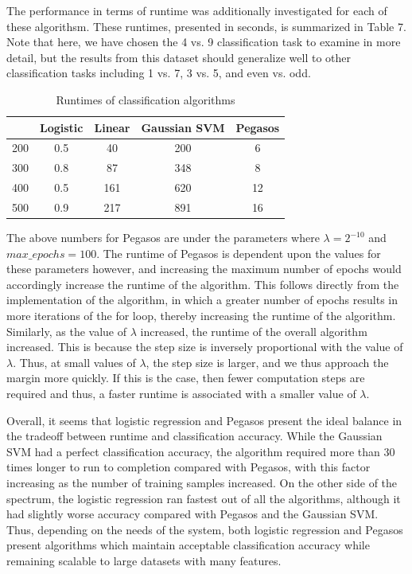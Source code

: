 \documentclass{article}
\begin{document}
The performance in terms of runtime was additionally investigated for each of these algorithsm. These runtimes, presented in seconds, is summarized in Table 7. Note that here, we have chosen the 4 vs. 9 classification task to examine in more detail, but the results from this dataset should generalize well to other classification tasks including 1 vs. 7, 3 vs. 5, and even vs. odd.

\begin{table}
  \begin{center}
    \begin{tabular}{ | c | c | c | c | c | }
      \hline
             & Logistic     & Linear   & Gaussian SVM & Pegasos    \\ \hline
      200    & 0.5          & 40           & 200           & 6          \\ \hline
      300    & 0.8          & 87           & 348           & 8          \\ \hline
      400    & 0.5          & 161          & 620           & 12         \\ \hline
      500    & 0.9          & 217          & 891           & 16         \\ \hline
    \end{tabular}
  \end{center}
  \caption{Runtimes of classification algorithms}
\end{table}

The above numbers for Pegasos are under the parameters where $\lambda = 2^{-10}$ and $max\_epochs = 100$. The runtime of Pegasos is dependent upon the values for these parameters however, and increasing the maximum number of epochs would accordingly increase the runtime of the algorithm. This follows directly from the implementation of the algorithm, in which a greater number of epochs results in more iterations of the for loop, thereby increasing the runtime of the algorithm. Similarly, as the value of $\lambda$ increased, the runtime of the overall algorithm increased. This is because the step size is inversely proportional with the value of $\lambda$. Thus, at small values of $\lambda$, the step size is larger, and we thus approach the margin more quickly. If this is the case, then fewer computation steps are required and thus, a faster runtime is associated with a smaller value of $\lambda$.

Overall, it seems that logistic regression and Pegasos present the ideal balance in the tradeoff between runtime and classification accuracy. While the Gaussian SVM had a perfect classification accuracy, the algorithm required more than 30 times longer to run to completion compared with Pegasos, with this factor increasing as the number of training samples increased. On the other side of the spectrum, the logistic regression ran fastest out of all the algorithms, although it had slightly worse accuracy compared with Pegasos and the Gaussian SVM. Thus, depending on the needs of the system, both logistic regression and Pegasos present algorithms which maintain acceptable classification accuracy while remaining scalable to large datasets with many features.
\end{document}
